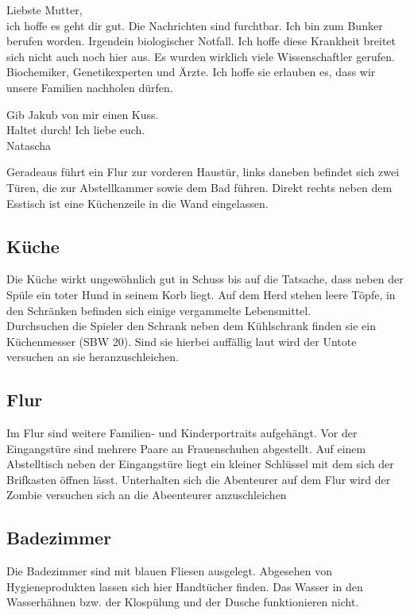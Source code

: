 \begin{itshape}
Liebste Mutter,
\\ich hoffe es geht dir gut. Die Nachrichten sind furchtbar. Ich bin zum Bunker berufen worden. Irgendein biologischer Notfall. Ich hoffe diese Krankheit breitet sich nicht auch noch hier aus. Es wurden wirklich viele Wissenschaftler gerufen. Biochemiker, Genetikexperten und Ärzte. Ich hoffe sie erlauben es, dass wir unsere Familien nachholen dürfen.

Gib Jakub von mir einen Kuss.
\\Haltet durch! Ich liebe euch.
\\Natascha
\end{itshape}

Geradeaus führt ein Flur zur vorderen Haustür, links daneben  befindet sich zwei Türen, die zur Abstellkammer sowie dem Bad führen. Direkt rechts neben dem Esstisch ist eine Küchenzeile in die Wand eingelassen.

\subsection{Küche}

Die Küche wirkt ungewöhnlich gut in Schuss bis auf die Tatsache, dass neben der Spüle ein toter Hund in seinem Korb liegt. Auf dem Herd stehen leere Töpfe, in den Schränken befinden sich einige vergammelte Lebensmittel.
\\Durchsuchen die Spieler den Schrank neben dem Kühlschrank finden sie ein Küchenmesser (SBW 20). Sind sie hierbei auffällig laut wird der Untote versuchen an sie heranzuschleichen.

\subsection{Flur}

Im Flur sind weitere Familien- und Kinderportraits aufgehängt. Vor der Eingangstüre sind mehrere Paare an Frauenschuhen abgestellt. Auf einem Abstelltisch neben der Eingangstüre liegt ein kleiner Schlüssel mit dem sich der Brifkasten öffnen lässt.
Unterhalten sich die Abenteurer auf dem Flur wird der Zombie versuchen sich an die Abeenteurer anzuschleichen

\subsection{Badezimmer}

Die Badezimmer sind mit blauen Fliesen ausgelegt. Abgesehen von Hygieneprodukten lassen sich hier Handtücher finden. Das Wasser in den Wasserhähnen bzw. der Klospülung und der Dusche funktionieren nicht.

